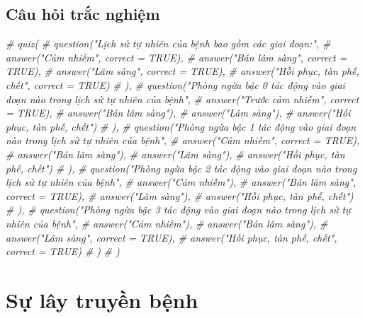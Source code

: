 \documentclass[
]{book}
\newenvironment{Shaded}{\begin{snugshade}}{\end{snugshade}}
\newcommand{\CommentTok}[1]{\textcolor[rgb]{0.56,0.35,0.01}{\textit{#1}}}
\begin{document}
\hypertarget{cuxe2u-hux1ecfi-trux1eafc-nghiux1ec7m-1}{%
\subsection{Câu hỏi trắc nghiệm}\label{cuxe2u-hux1ecfi-trux1eafc-nghiux1ec7m-1}}

\begin{Shaded}
\begin{Highlighting}[]
\CommentTok{\# quiz(}
\CommentTok{\#   question("Lịch sử tự nhiên của bệnh bao gồm các giai đoạn:",}
\CommentTok{\#     answer("Cảm nhiễm", correct = TRUE),}
\CommentTok{\#     answer("Bán lâm sàng", correct = TRUE),}
\CommentTok{\#     answer("Lâm sàng", correct = TRUE),}
\CommentTok{\#     answer("Hồi phục, tàn phế, chết", correct = TRUE)}
\CommentTok{\#   ),}
\CommentTok{\#   question("Phòng ngừa bậc 0 tác động vào giai đoạn nào trong lịch sử tự nhiên của bệnh",}
\CommentTok{\#     answer("Trước cảm nhiễm", correct = TRUE),}
\CommentTok{\#     answer("Bán lâm sàng"),}
\CommentTok{\#     answer("Lâm sàng"),}
\CommentTok{\#     answer("Hồi phục, tàn phế, chết")}
\CommentTok{\#   ),}
\CommentTok{\#   question("Phòng ngừa bậc 1 tác động vào giai đoạn nào trong lịch sử tự nhiên của bệnh",}
\CommentTok{\#     answer("Cảm nhiễm", correct = TRUE),}
\CommentTok{\#     answer("Bán lâm sàng"),}
\CommentTok{\#     answer("Lâm sàng"),}
\CommentTok{\#     answer("Hồi phục, tàn phế, chết")}
\CommentTok{\#   ),}
\CommentTok{\#   question("Phòng ngừa bậc 2 tác động vào giai đoạn nào trong lịch sử tự nhiên của bệnh",}
\CommentTok{\#     answer("Cảm nhiễm"),}
\CommentTok{\#     answer("Bán lâm sàng", correct = TRUE),}
\CommentTok{\#     answer("Lâm sàng"),}
\CommentTok{\#     answer("Hồi phục, tàn phế, chết")}
\CommentTok{\#   ),}
\CommentTok{\#   question("Phòng ngừa bậc 3 tác động vào giai đoạn nào trong lịch sử tự nhiên của bệnh",}
\CommentTok{\#     answer("Cảm nhiễm"),}
\CommentTok{\#     answer("Bán lâm sàng"),}
\CommentTok{\#     answer("Lâm sàng", correct = TRUE),}
\CommentTok{\#     answer("Hồi phục, tàn phế, chết", correct = TRUE)}
\CommentTok{\#   )}
\CommentTok{\# )}
\end{Highlighting}
\end{Shaded}

\hypertarget{sux1ef1-luxe2y-truyux1ec1n-bux1ec7nh}{%
\section{Sự lây truyền bệnh}\label{sux1ef1-luxe2y-truyux1ec1n-bux1ec7nh}}
\end{document}
